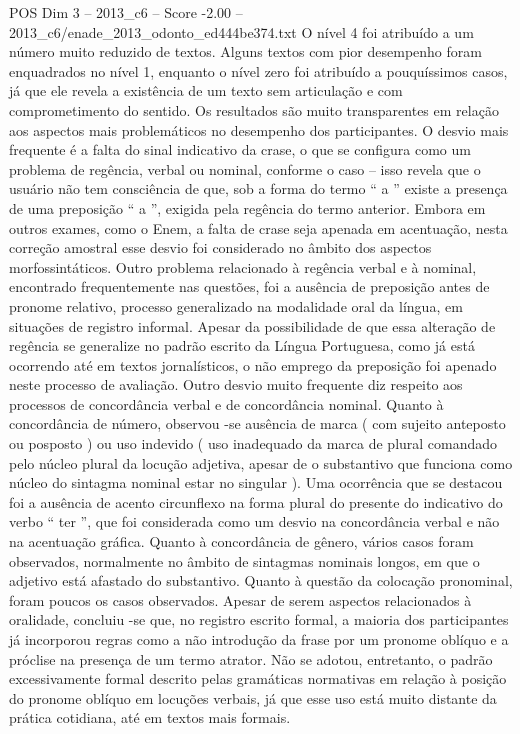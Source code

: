 \begin{textsample}{POS Dim 3 – 2013\_c6 – Score -2.00 – 2013\_c6/enade\_2013\_odonto\_ed444be374.txt}
O nível 4 foi atribuído a um número muito reduzido de textos.
Alguns textos com pior desempenho foram enquadrados no nível 1, enquanto o nível zero foi atribuído a pouquíssimos casos, já que ele revela a existência de um texto sem articulação e com comprometimento do sentido.
Os resultados são muito transparentes em relação aos aspectos mais problemáticos no desempenho dos participantes.
O desvio mais frequente é a falta do sinal indicativo da crase, o que se configura como um problema de regência, verbal ou nominal, conforme o caso – isso revela que o usuário não tem consciência de que, sob a forma do termo “ a ” existe a presença de uma preposição “ a ”, exigida pela regência do termo anterior.
Embora em outros exames, como o Enem, a falta de crase seja apenada em acentuação, nesta correção amostral esse desvio foi considerado no âmbito dos aspectos morfossintáticos.
Outro problema relacionado à regência verbal e à nominal, encontrado frequentemente nas questões, foi a ausência de preposição antes de pronome relativo, processo generalizado na modalidade oral da língua, em situações de registro informal.
Apesar da possibilidade de que essa alteração de regência se generalize no padrão escrito da Língua Portuguesa, como já está ocorrendo até em textos jornalísticos, o não emprego da preposição foi apenado neste processo de avaliação.
Outro desvio muito frequente diz respeito aos processos de concordância verbal e de concordância nominal.
Quanto à concordância de número, observou -se ausência de marca ( com sujeito anteposto ou posposto ) ou uso indevido ( uso inadequado da marca de plural comandado pelo núcleo plural da locução adjetiva, apesar de o substantivo que funciona como núcleo do sintagma nominal estar no singular ).
Uma ocorrência que se destacou foi a ausência de acento circunflexo na forma plural do presente do indicativo do verbo “ ter ”, que foi considerada como um desvio na concordância verbal e não na acentuação gráfica.
Quanto à concordância de gênero, vários casos foram observados, normalmente no âmbito de sintagmas nominais longos, em que o adjetivo está afastado do substantivo.
Quanto à questão da colocação pronominal, foram poucos os casos observados.
Apesar de serem aspectos relacionados à oralidade, concluiu -se que, no registro escrito formal, a maioria dos participantes já incorporou regras como a não introdução da frase por um pronome oblíquo e a próclise na presença de um termo atrator.
Não se adotou, entretanto, o padrão excessivamente formal descrito pelas gramáticas normativas em relação à posição do pronome oblíquo em locuções verbais, já que esse uso está muito distante da prática cotidiana, até em textos mais formais.

\end{textsample}
